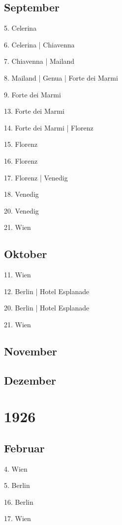 \documentclass[twoside=false,titlepage=false,open=any, parskip=never, fontsize=10pt, headings=small, chapterprefix=false, appendixprefix=false, DIV=15]{scrbook}
\begin{document}
\begin{multicols}{3}
            \section*{September}
            5. Celerina\par
            6. Celerina | Chiavenna\par
            7. Chiavenna | Mailand\par
            8. Mailand | Genua | Forte dei Marmi\par
            9. Forte dei Marmi\par
            13. Forte dei Marmi\par
            14. Forte dei Marmi | Florenz\par
            15. Florenz\par
            16. Florenz\par
            17. Florenz | Venedig\par
            18. Venedig\par
            20. Venedig\par
            21. Wien\par
            \section*{Oktober}
            11. Wien\par
            12. Berlin | Hotel Esplanade\par
            20. Berlin | Hotel Esplanade\par
            21. Wien\par
            \section*{November}
            \section*{Dezember}
            \chapter*{1926}
            \section*{Februar}
            4. Wien\par
            5. Berlin\par
            16. Berlin\par
            17. Wien\par

\end{multicols}
\end{document}
